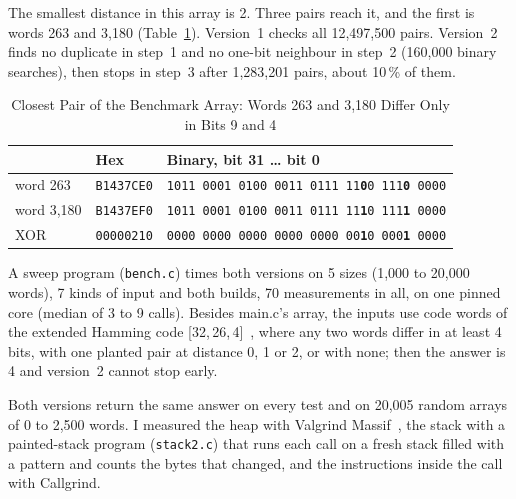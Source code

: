 \documentclass[conference,a4paper]{IEEEtran}
\newcommand{\code}[1]{\texttt{#1}}
\begin{document}
The smallest distance in this array is 2. Three pairs reach it, and the first is
words 263 and 3,180 (Table~\ref{tab:pair}). Version~1 checks all 12,497,500
pairs. Version~2 finds no duplicate in step~1 and no one-bit neighbour in
step~2 (160,000 binary searches), then stops in step~3 after 1,283,201 pairs,
about 10\,\% of them.

\begin{table}[!t]
\caption{Closest Pair of the Benchmark Array: Words 263 and 3,180 Differ Only
in Bits 9 and 4}
\label{tab:pair}
\centering\footnotesize
\setlength{\tabcolsep}{3.5pt}
\begin{tabular}{@{}lll@{}}
\toprule
 & \textbf{Hex} & \textbf{Binary, bit 31 \dots{} bit 0} \\
\midrule
word 263   & \code{B1437CE0} & \code{1011 0001 0100 0011 0111 11\textbf{0}0 111\textbf{0} 0000} \\
word 3,180 & \code{B1437EF0} & \code{1011 0001 0100 0011 0111 11\textbf{1}0 111\textbf{1} 0000} \\
XOR        & \code{00000210} & \code{0000 0000 0000 0000 0000 00\textbf{1}0 000\textbf{1} 0000} \\
\bottomrule
\end{tabular}
\end{table}

A sweep program (\code{bench.c}) times both versions on 5 sizes (1,000 to 20,000
words), 7 kinds of input and both builds, 70 measurements in all, on one pinned
core (median of 3 to 9 calls). Besides main.c's array, the inputs use code words
of the extended Hamming code [32,\,26,\,4]~\cite{hamming}, where any two words
differ in at least 4 bits, with one planted pair at distance 0, 1 or 2, or with
none; then the answer is 4 and version~2 cannot stop early.

Both versions return the same answer on every test and on 20,005 random arrays
of 0 to 2,500 words. I measured the heap with Valgrind Massif~\cite{valgrind},
the stack with a painted-stack program (\code{stack2.c}) that runs each call on
a fresh stack filled with a pattern and counts the bytes that changed, and the
instructions inside the call with Callgrind.
\end{document}
